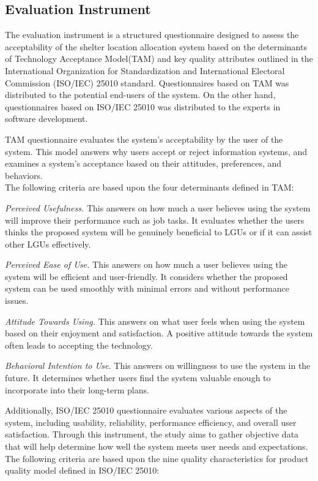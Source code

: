 \subsection{Evaluation Instrument}
	The evaluation instrument is a structured questionnaire designed to assess the acceptability of the shelter location allocation system based on the determinants of Technology Acceptance Model(TAM) and key quality attributes outlined in the International Organization for Standardization and International Electoral Commission (ISO/IEC) 25010 standard. Questionnaires based on TAM was distributed to the potential end-users of the system. On the other hand, questionnaires based on ISO/IEC 25010 was distributed to the experts in software development.
	
	TAM questionnaire evaluates the system's acceptability by the user of the system. This model answers why users accept or reject information systems, and examines a system's acceptance based on their attitudes, preferences, and behaviors.\parencite{Davis1987}
	\\The following criteria are based upon the four determinants defined in TAM:
	
	\textit{Perceived Usefulness.} This answers on how much a user believes using the system will improve their performance such as job tasks. It evaluates whether the users thinks the proposed system will be genuinely beneficial to LGUs or if it can assist other LGUs effectively.
	
	\textit{Perceived Ease of Use.} This answers on how much a user believes using the system will be efficient and user-friendly. It considers whether the proposed system can be used smoothly with minimal errors and without performance issues.
	
	\textit{Attitude Towards Using.} This answers on what user feels when using the system based on their enjoyment and satisfaction. A positive attitude towards the system often leads to accepting the technology.
	
	\textit{Behavioral Intention to Use.} This answers on willingness to use the system in the future. It determines whether users find the system valuable enough to incorporate into their long-term plans.
	
	Additionally, ISO/IEC 25010 questionnaire evaluates various aspects of the system, including usability, reliability, performance efficiency, and overall user satisfaction. Through this instrument, the study aims to gather objective data that will help determine how well the system meets user needs and expectations. \parencite{ISOIEC2023}
	\\The following criteria are based upon the nine quality characteristics for product quality model defined in ISO/IEC 25010:
	

